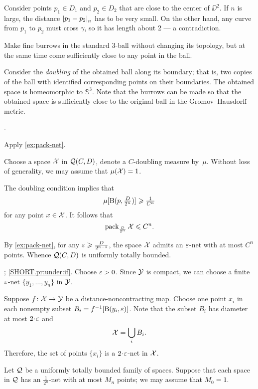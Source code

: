 Consider points $p_1\in D_1$ and $p_2\in D_2$ that are close to the center of $\DD^2$.
If $n$ is large, the distance $\dist{p_1}{p_2}{n}$ has to be very small.
On the other hand, any curve from $p_1$ to $p_2$ must cross $\gamma$, so it has length about 2 --- a contradiction.

Make fine burrows in the standard 3-ball without changing its topology,
but at the same time come sufficiently close to any point in the ball.

Consider the \emph{doubling} of the obtained ball along its boundary;
that is, two copies of the ball with identified corresponding points on their boundaries.
The obtained space is homeomorphic to $\mathbb{S}^3$.
Note that the burrows can be made 
so that the obtained space is sufficiently close to the original ball 
in the Gromov--Hausdorff metric.

 \cite[Exercises 7.5.13 and 7.5.17]{burago-burago-ivanov}. 

 Apply \ref{ex:pack-net}.

Choose a space $\mathcal{X}$ in $\mathcal{Q}(C,D)$, denote a $C$-doubling measure by~$\mu$.
Without loss of generality, we may assume that $\mu(\spc{X})\z=1$.

The doubling condition implies that 
\[\mu[\mathrm{B}{}(p,\tfrac D{2^n})]\geqslant\tfrac 1{C^n}\]
for any point $x\in \mathcal{X}$.
It follows that 
\[\operatorname{\rm pack}\nolimits_{\frac D{2^n}}\mathcal{X}\leqslant C^n.\]

By \ref{ex:pack-net}, for any $\varepsilon\geqslant\frac D{2^{n-1}}$, the space $\mathcal{X}$ admits an $\varepsilon$-net with at most $C^n$ points.
Whence $\mathcal{Q}(C,D)$ is uniformly totally bounded.

\parbf{\ref{pr:under}}; \ref{SHORT.pr:under:if}.
Choose $\varepsilon>0$.
Since $\mathcal{Y}$ is compact, we can choose a finite $\varepsilon$-net $\{y_1,\dots,y_{n}\}$ in $\mathcal{Y}$.

Suppose $f\colon\mathcal{X}\to \mathcal{Y}$ be a distance-noncontracting map.
Choose one point $x_i$ in each nonempty subset $B_i=f^{-1}[\mathrm{B}{}(y_i,\varepsilon)]$.
Note that the subset $B_i$ has diameter at most $2\cdot \eps$ and 
\[\mathcal{X}=\bigcup_iB_i.\]
Therefore, the set of points $\{x_i\}$ is a $2\cdot\eps$-net in $\mathcal{X}$.

 Let $\mathcal{Q}$ be a uniformly totally bounded family of spaces. 
Suppose that each space in $\mathcal{Q}$ has an $\tfrac1{2^n}$-net with at most $M_n$ points; we may assume that $M_0=1$.

